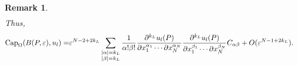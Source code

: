 \documentclass[11pt,reqno]{article}
\newtheorem{rem}[teo]{Remark}
\numberwithin{equation}{section}
\newcommand\e\varepsilon
\renewcommand\O\Omega
\begin{document}
\begin{rem}
\begin{equation}
\begin{aligned}
            \end{aligned}
        \end{equation}
       Thus, 
        \begin{align*}
            \hbox{Cap}_\O(B(P,\e),u_l)
            =&\e^{N-2+2{ k_L}}	\sum_{\substack{|\alpha|={ k_L}\\
           |\beta|={ k_L}}}\frac{1}{\alpha!\beta!}\frac{\partial^{{ k_L}} u_l (P)}{\partial x_{1}^{\alpha_1}\cdots\partial x_{N}^{\alpha_N}}\frac{\partial^{{ k_L}} u_l (P)}{\partial x_{1}^{\beta_1}\cdots\partial x_{N}^{\beta_N}}C_{\alpha\beta}+O(\e^{N-1+2{ k_L}}).
        \end{align*}
    \end{rem}
\end{document}
